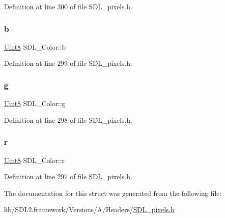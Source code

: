 Definition at line 300 of file S\+D\+L\+\_\+pixels.\+h.

\mbox{\label{struct_s_d_l___color_a3b79a27e0414049559aa5bcf241dedd3}} 
\subsubsection{\texorpdfstring{b}{b}}
{\footnotesize\ttfamily \mbox{\hyperlink{_s_d_l__stdinc_8h_a2944638813a090aa23e62f4da842c3e2}{Uint8}} S\+D\+L\+\_\+\+Color\+::b}



Definition at line 299 of file S\+D\+L\+\_\+pixels.\+h.

\mbox{\label{struct_s_d_l___color_ae29d881bf740cfa7078b36e07f85d298}} 
\subsubsection{\texorpdfstring{g}{g}}
{\footnotesize\ttfamily \mbox{\hyperlink{_s_d_l__stdinc_8h_a2944638813a090aa23e62f4da842c3e2}{Uint8}} S\+D\+L\+\_\+\+Color\+::g}



Definition at line 298 of file S\+D\+L\+\_\+pixels.\+h.

\mbox{\label{struct_s_d_l___color_a0bb975b6829524133fdd3c6060cfa63d}} 
\subsubsection{\texorpdfstring{r}{r}}
{\footnotesize\ttfamily \mbox{\hyperlink{_s_d_l__stdinc_8h_a2944638813a090aa23e62f4da842c3e2}{Uint8}} S\+D\+L\+\_\+\+Color\+::r}



Definition at line 297 of file S\+D\+L\+\_\+pixels.\+h.



The documentation for this struct was generated from the following file\+:\begin{DoxyCompactItemize}
\item 
lib/\+S\+D\+L2.\+framework/\+Versions/\+A/\+Headers/\mbox{\hyperlink{_s_d_l__pixels_8h}{S\+D\+L\+\_\+pixels.\+h}}\end{DoxyCompactItemize}
